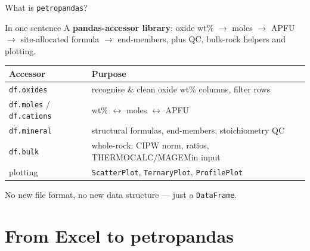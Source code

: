 \documentclass[aspectratio=169,11pt]{beamer}
\begin{document}
\begin{frame}{What is \texttt{petropandas}?}
  \begin{block}{In one sentence}
    A \textbf{pandas-accessor library}: oxide wt\% $\rightarrow$ moles
    $\rightarrow$ APFU $\rightarrow$ site-allocated formula
    $\rightarrow$ end-members, plus QC, bulk-rock helpers and plotting.
  \end{block}
  \vspace{0.3cm}
  \begin{center}
    \small
    \begin{tabular}{ll}
      \toprule
      \textbf{Accessor} & \textbf{Purpose} \\
      \midrule
      \texttt{df.oxides} & recognise \& clean oxide wt\% columns, filter rows \\
      \texttt{df.moles} / \texttt{df.cations} & wt\% $\leftrightarrow$ moles $\leftrightarrow$ APFU \\
      \texttt{df.mineral} & structural formulas, end-members, stoichiometry QC \\
      \texttt{df.bulk} & whole-rock: CIPW norm, ratios, THERMOCALC/MAGEMin input \\
      plotting & \texttt{ScatterPlot}, \texttt{TernaryPlot}, \texttt{ProfilePlot} \\
      \bottomrule
    \end{tabular}
  \end{center}
  \vspace{0.2cm}
  \centering No new file format, no new data structure --- just a \texttt{DataFrame}.
\end{frame}

\section{From Excel to petropandas}
\end{document}
